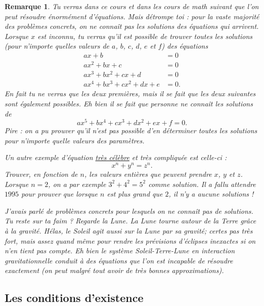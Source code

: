 \documentclass[a4paper,12pt]{book}
\newcounter{numtho}
\theoremstyle{mes_exemples}	\newtheorem{exemple}[numtho]{Exemple}
\newtheorem{remark}[numtho]{Remarque}
\theoremstyle{mes_tho}
\begin{document}
\begin{remark}
Tu verras dans ce cours et dans les cours de math suivant que l'on peut résoudre énormément d'équations. Mais détrompe toi : pour la vaste majorité des problèmes concrets, on ne connaît pas les solutions des équations qui arrivent. Lorsque $x$ est inconnu, tu verras qu'il est possible de trouver toutes les solutions (pour n'importe quelles valeurs de $a$, $b$, $c$, $d$, $e$ et $f$) des équations
\begin{align*}
ax+b&=0\\
ax^{2}+bx+c&=0\\
ax^{3}+bx^{2}+cx+d&=0\\
ax^{4}+bx^{3}+cx^{2}+dx+e&=0.
\end{align*}
En fait tu ne verras que les deux premières, mais il se fait que les deux suivantes sont également possibles. Eh bien il se fait que personne ne connaît les solutions de
\[ 
  ax^{5}+bx^{4}+cx^{3}+dx^{2}+ex+f=0.
\]
Pire : on a pu prouver qu'il n'est pas possible d'en déterminer toutes les solutions pour n'importe quelle valeurs des paramètres.

Un autre exemple d'équation \href{http://fr.wikipedia.org/wiki/Dernier_théorème_de_Fermat}{très célèbre} et très compliquée est celle-ci :
\[ 
  x^{n}+y^{n}=z^{n}.
\]
Trouver, en fonction de $n$, les valeurs \emph{entières} que peuvent prendre $x$, $y$ et $z$. Lorsque $n=2$, on a par exemple $3^{2}+4^{2}=5^{2}$ comme solution. Il a fallu attendre $1995$ pour prouver que lorsque $n$ est plus grand que $2$, il n'y a aucune solutions !

J'avais parlé de problèmes concrets pour lesquels on ne connaît pas de solutions. Tu reste sur ta faim ? Regarde la Lune. La Lune tourne autour de la Terre grâce à la gravité. Hélas, le Soleil agit aussi sur la Lune par sa gravité; certes pas très fort, mais assez quand même pour rendre les prévisions d'éclipses inexactes si on n'en tient pas compte. Eh bien le système Soleil-Terre-Lune en interaction gravitationnelle conduit à des équations que l'on est incapable de résoudre exactement (on peut malgré tout avoir de très bonnes approximations).
\end{remark}

\subsection{Les conditions d'existence}
\end{document}
